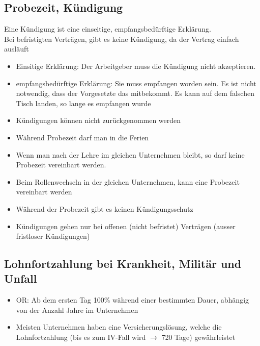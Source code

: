 \documentclass{report}
\theoremstyle{definition}
\theoremstyle{example}
\begin{document}
\subsection{Probezeit, Kündigung}
Eine Kündigung ist eine einseitige, empfangsbedürftige Erklärung.\\
Bei befristigten Verträgen, gibt es keine Kündigung, da der Vertrag einfach ausläuft\\

\begin{itemize}
   \item Einsitige Erklärung: Der Arbeitgeber muss die Kündigung nicht akzeptieren.
   \item empfangsbedürftige Erklärung: Sie muss empfangen worden sein. Es ist nicht notwendig, dass der Vorgesetzte das mitbekommt. 
   \subitem Es kann auf dem falschen Tisch landen, so lange es empfangen wurde
   \item Kündigungen können nicht zurückgenommen werden
   \item Während Probezeit darf man in die Ferien
   \item Wenn man nach der Lehre im gleichen Unternehmen bleibt, so darf keine Probezeit vereinbart werden.
   \item Beim Rollenwechseln in der gleichen Unternehmen, kann eine Probezeit vereinbart werden
   \item Während der Probezeit gibt es keinen Kündigungsschutz
   \item Kündigungen gehen nur bei offenen (nicht befristet) Verträgen (ausser fristloser Kündigungen)
\end{itemize}

\subsection{Lohnfortzahlung bei Krankheit, Militär und Unfall}
\begin{itemize}
   \item OR: Ab dem ersten Tag 100\% während einer bestimmten Dauer, abhängig von der Anzahl Jahre im Unternehmen
   \item Meisten Unternehmen haben eine Versicherungslösung, welche die Lohnfortzahlung (bis es zum IV-Fall wird $\rightarrow$ 720 Tage) gewährleistet 
\end{itemize}
\end{document}
